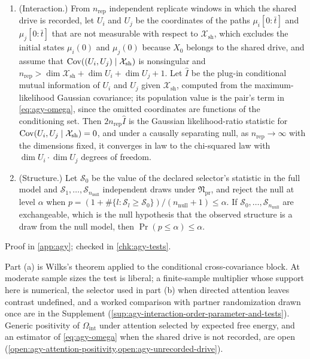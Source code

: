 \begin{proposition}\label{prop:agy-tests}
\begin{enumerate}
\item[(a)] (Interaction.) From $n_{\mathrm{rep}}$ independent replicate windows in which the shared drive is recorded, let $U_i$ and $U_j$ be the coordinates of the paths $\mu_i[0{:}\bar t]$ and $\mu_j[0{:}\bar t]$ that are not measurable with respect to $\mathcal X_{\mathrm{sh}}$, which excludes the initial states $\mu_i(0)$ and $\mu_j(0)$ because $X_0$ belongs to the shared drive, and assume that $\operatorname{Cov}((U_i,U_j)\mid\mathcal X_{\mathrm{sh}})$ is nonsingular and $n_{\mathrm{rep}}>\dim\mathcal X_{\mathrm{sh}}+\dim U_i+\dim U_j+1$. Let $\hat I$ be the plug-in conditional mutual information of $U_i$ and $U_j$ given $\mathcal X_{\mathrm{sh}}$, computed from the maximum-likelihood Gaussian covariance; its population value is the pair's term in \eqref{eq:agy-omega}, since the omitted coordinates are functions of the conditioning set. Then $2n_{\mathrm{rep}}\hat I$ is the Gaussian likelihood-ratio statistic for $\operatorname{Cov}(U_i,U_j\mid\mathcal X_{\mathrm{sh}})=0$, and under a causally separating null, as $n_{\mathrm{rep}}\to\infty$ with the dimensions fixed, it converges in law to the chi-squared law with $\dim U_i\cdot\dim U_j$ degrees of freedom.
\item[(b)] (Structure.) Let $\mathcal S_0$ be the value of the declared selector's statistic in the full model and $\mathcal S_1,\dots,\mathcal S_{n_{\mathrm{null}}}$ independent draws under $\mathfrak N_{\mathrm{pr}}$, and reject the null at level $\alpha$ when $p=(1+\#\{l:\mathcal S_l\ge\mathcal S_0\})/(n_{\mathrm{null}}+1)\le\alpha$. If $\mathcal S_0,\dots,\mathcal S_{n_{\mathrm{null}}}$ are exchangeable, which is the null hypothesis that the observed structure is a draw from the null model, then $\Pr(p\le\alpha)\le\alpha$.
\end{enumerate}
Proof in \cref{app:agy}; checked in \cref{chk:agy-tests}.
\end{proposition}

Part (a) is Wilks's theorem \citep{wilks1938large} applied to the conditional cross-covariance block. At moderate sample sizes the test is liberal; a finite-sample multiplier whose support here is numerical, the selector used in part (b) when directed attention leaves contrast undefined, and a worked comparison with partner randomization drawn once are in the Supplement (\cref{sup:agy-interaction-order-parameter-and-tests}). Generic positivity of $\Omega_{\mathrm{int}}$ under attention selected by expected free energy, and an estimator of \eqref{eq:agy-omega} when the shared drive is not recorded, are open (\cref{open:agy-attention-positivity,open:agy-unrecorded-drive}).


